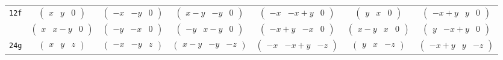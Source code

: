 \documentclass[fleqn,9pt,landscape]{jsarticle}
\begin{document}
\begin{center}
\begin{longtable}{ccccccc}
{\tt 12f} & $ \begin{pmatrix} x & y & 0 \end{pmatrix} $ & $ \begin{pmatrix} - x & - y & 0 \end{pmatrix} $ & $ \begin{pmatrix} x - y & - y & 0 \end{pmatrix} $ & $ \begin{pmatrix} - x & - x + y & 0 \end{pmatrix} $ & $ \begin{pmatrix} y & x & 0 \end{pmatrix} $ & $ \begin{pmatrix} - x + y & y & 0 \end{pmatrix} $ \\
& $ \begin{pmatrix} x & x - y & 0 \end{pmatrix} $ & $ \begin{pmatrix} - y & - x & 0 \end{pmatrix} $ & $ \begin{pmatrix} - y & x - y & 0 \end{pmatrix} $ & $ \begin{pmatrix} - x + y & - x & 0 \end{pmatrix} $ & $ \begin{pmatrix} x - y & x & 0 \end{pmatrix} $ & $ \begin{pmatrix} y & - x + y & 0 \end{pmatrix} $ \\ \hline
{\tt 24g} & $ \begin{pmatrix} x & y & z \end{pmatrix} $ & $ \begin{pmatrix} - x & - y & z \end{pmatrix} $ & $ \begin{pmatrix} x - y & - y & - z \end{pmatrix} $ & $ \begin{pmatrix} - x & - x + y & - z \end{pmatrix} $ & $ \begin{pmatrix} y & x & - z \end{pmatrix} $ & $ \begin{pmatrix} - x + y & y & - z \end{pmatrix} $ \\

\end{longtable}
\end{center}
\end{document}
